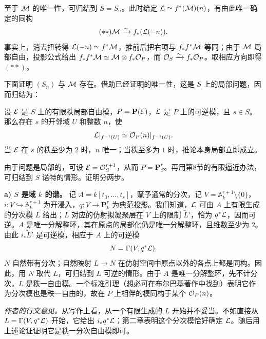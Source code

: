 至于 \(\mathcal M\) 的唯一性，可归结到 \(S=S_n\)。此时给定 \(\mathcal L\simeq f^*(\mathcal M)(n)\)，有由此唯一确定的同构
\[
(**) \mathcal M\xrightarrow{\sim}f_*(\mathcal L(-n)).
\]
事实上，消去扭转得 \(\mathcal L(-n)\simeq f^*\mathcal M\)，推前后把右项与 \(f_*f^*\mathcal M\) 等同；由于 \(\mathcal M\) 局部自由，投影公式给出 \(f_*f^*\mathcal M\simeq \mathcal M\otimes f_*\mathcal O_P\)，而 \(\mathcal O_S\xrightarrow{\sim}f_*\mathcal O_P\)。取相应方向即得 \((**)\)。

下面证明 \((S_n)\) 与 \(\mathcal M\) 存在。借助已经证明的唯一性，这是 \(S\) 上的局部问题，因而归结为：


设 \(\mathcal E\) 是 \(S\) 上的有限秩局部自由模，\(P=\mathbf P(\mathcal E)\)，\(\mathcal L\) 是 \(P\) 上的可逆模，且 \(s\in S\)。那么存在 \(s\) 的开邻域 \(U\) 和整数 \(n\)，使
\[
 \mathcal L|_{f^{-1}(U)}\simeq \mathcal O_P(n)|_{f^{-1}(U)} .
\]
当 \(\mathcal E\) 在 \(s\) 的秩至少为 \(2\) 时，\(n\) 唯一；当秩至多为 \(1\) 时，推论本身局部立即成立。

由于问题是局部的，可设 \(\mathcal E=\mathcal O_S^{r+1}\)，从而 \(P=\mathbf P_S^r\)。再用第8节的有限逼近办法，可归结到 \(S\) 诺特的情形。证明分两步。

\medskip\noindent\textbf{a) \(S\) 是域 \(k\) 的谱。}
记 \(A=k[t_0,\ldots,t_r]\)，赋予通常的分次，记 \(V=\mathbb A_k^{r+1}\setminus\{0\}\)，\(i:V\hookrightarrow\mathbb A_k^{r+1}\) 为开浸入，\(q:V\to\mathbf P_k^r\) 为典范投影。我们知道，\(\mathcal L\) 可由 \(A\) 上有限生成的分次模 \(L\) 给出；\(L\) 对应的仿射拟凝聚层在 \(V\) 上的限制 \(\widetilde L'\)，恰为 \(q^*\mathcal L\)，因而可逆。\(A\) 是唯一分解整环，其在原点的局部化仍是唯一分解整环，且维数至少为 \(2\)。由此 \(i_*\widetilde L'\) 是可逆模，相应于 \(A\) 上的可逆模
\[
N=\Gamma(V,q^*\mathcal L).
\]
\(N\) 自然带有分次；自然映射 \(L\to N\) 在仿射空间中原点以外的各点上都是同构。因此，用 \(N\) 取代 \(L\)，可归结到 \(L\) 可逆的情形。由于 \(A\) 是唯一分解整环，先不计分次，\(L\) 是秩一自由模。一个标准引理（想必可在布尔巴基著作中找到）表明它作为分次模也是秩一自由的，故在 \(P\) 上相伴的模同构于某个 \(\mathcal O_P(n)\)。

\emph{作者的行文意见。}从写作上看，从一个有限生成的 \(L\) 开始并不妥当。不如直接从 \(L=\Gamma(V,q^*\mathcal L)\) 开始，它给出 \(i_*q^*\mathcal L\)；第二章表明这个分次模恰好确定 \(\mathcal L\)。随后用上述论证证明它是秩一分次自由模即可。


